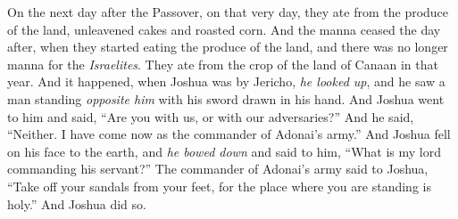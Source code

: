 \begin{biblechapter}
\verse On the next day after the Passover, on that very day, they ate from the produce of the land, unleavened cakes and roasted corn.
\verse And the manna ceased the day after, when they started eating the produce of the land, and there was no longer manna for the \textit{Israelites}. They ate from the crop of the land of Canaan in that year.
 And it happened, when Joshua was by Jericho, \textit{he looked up}, and he saw a man standing \textit{opposite him} with his sword drawn in his hand. And Joshua went to him and said, “Are you with us, or with our adversaries?”
\verse And he said, “Neither. I have come now as the commander of Adonai’s army.” And Joshua fell on his face to the earth, and \textit{he bowed down} and said to him, “What is my lord commanding his servant?”
\verse The commander of Adonai’s army said to Joshua, “Take off your sandals from your feet, for the place where you are standing is holy.” And Joshua did so.
\end{biblechapter}

